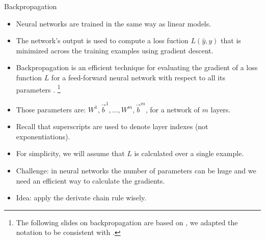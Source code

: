 \documentclass[handout]{beamer}
\begin{document}
\begin{frame}{Backpropagation}
\begin{scriptsize}


\begin{itemize}
\item Neural networks are trained in the same way as linear models.

\item The network's output is used to compute a loss fuction $L(\hat{y},y)$ that is minimized across the training examples using gradient descent. 
\item Backpropagation is an efficient technique for evaluating the gradient
of a loss function $L$ for a feed-forward neural network with respect to all its parameters \cite{bishop2006pattern}. \footnote{The following slides on backpropagation are based on \cite{bishop2006pattern}, we adapted the notation to be consistent with \cite{goldberg2017neural}.}
\item Those parameters are: $W^1, \vec{b}^1, \dots, W^m, \vec{b}^m$, for a network of $m$ layers.
\item Recall that superscripts are used to denote layer indexes (not exponentiations).
\item For simplicity, we will assume that $L$ is calculated over a single example.
\item Challenge: in neural networks the number of parameters can be huge and we need an efficient way to calculate the gradients.

\item Idea: apply the derivate chain rule wisely.

\end{itemize}


\end{scriptsize}
\end{frame}
\end{document}
